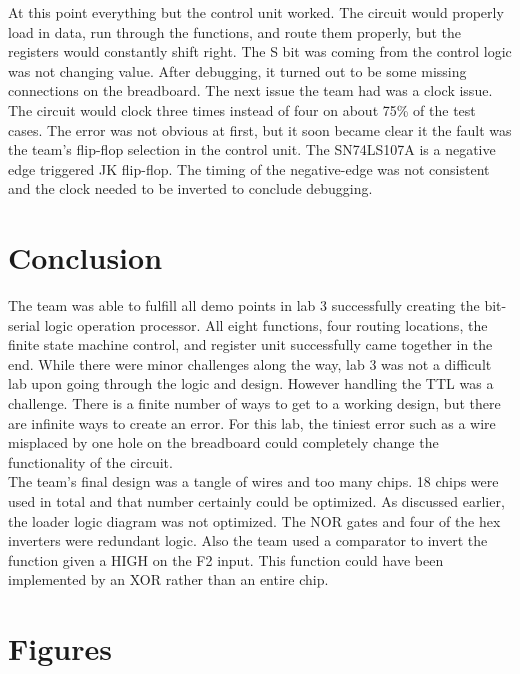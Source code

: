 \documentclass[journal, twocolumn, final,11pt,letterpaper]{IEEEtran}
\begin{document}
At this point everything but the control unit worked.  The circuit would properly load in data, run through the functions, and route them properly, but the registers would constantly shift right.  The S bit was coming from the control logic was not changing value.  After debugging, it turned out to be some missing connections on the breadboard.  The next issue the team had was a clock issue.  The circuit would clock three times instead of four on about 75\% of the test cases.  The error was not obvious at first, but it soon became clear it the fault was the team's flip-flop selection in the control unit.  The SN74LS107A is a negative edge triggered JK flip-flop.  The timing of the negative-edge was not consistent and the clock needed to be inverted to conclude debugging. \\     


\section{Conclusion}
The team was able to fulfill all demo points in lab 3 successfully creating the bit-serial logic operation processor. All eight functions, four routing locations, the finite state machine control, and register unit successfully came together in the end.  While there were minor challenges along the way, lab 3 was not a difficult lab upon going through the logic and design.  However handling the TTL was a challenge.  There is a finite number of ways to get to a working design, but there are infinite ways to create an error.  For this lab, the tiniest error such as a wire misplaced by one hole on the breadboard could completely change the functionality of the circuit.\\

The team's final design was a tangle of wires and too many chips.  18 chips were used in total and that number certainly could be optimized.  As discussed earlier, the loader logic diagram was not optimized. The NOR gates and four of the hex inverters were redundant logic. Also the team used a comparator to invert the function given a HIGH on the F2 input.  This function could have been implemented by an XOR rather than an entire chip. \\

\clearpage
\onecolumn
\section{Figures}
\end{document}
